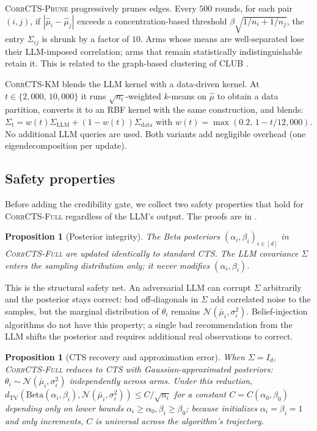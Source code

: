 \documentclass{article}
\theoremstyle{plain}
\newtheorem{proposition}[theorem]{Proposition}
\theoremstyle{definition}
\theoremstyle{remark}
\newcommand{\CorrFull}{\textsc{CorrCTS-Full}}
\newcommand{\EdgePrune}{\textsc{CorrCTS-Prune}}
\newcommand{\KMRefine}{\textsc{CorrCTS-KM}}
\begin{document}
\EdgePrune{} progressively prunes edges.
Every $500$ rounds, for each pair $(i,j)$, if $|\hat\mu_i - \hat\mu_j|$ exceeds a concentration-based threshold $\beta \sqrt{1/n_i + 1/n_j}$, the entry $\Sigma_{ij}$ is shrunk by a factor of $10$.
Arms whose means are well-separated lose their LLM-imposed correlation; arms that remain statistically indistinguishable retain it.
This is related to the graph-based clustering of CLUB \citep{gentile2014online}.

\KMRefine{} blends the LLM kernel with a data-driven kernel.
At $t \in \{2{,}000,\, 10{,}000\}$ it runs $\sqrt{n_i}$-weighted $k$-means on $\hat\mu$ to obtain a data partition, converts it to an RBF kernel with the same construction, and blends: $\Sigma_t = w(t) \Sigma_{\text{LLM}} + (1 - w(t)) \Sigma_{\text{data}}$ with $w(t) = \max(0.2,\, 1 - t/12{,}000)$.
No additional LLM queries are used.
Both variants add negligible overhead (one eigendecomposition per update).

\subsection{Safety properties}\label{sec:safety}

Before adding the credibility gate, we collect two safety properties that hold for \CorrFull{} regardless of the LLM's output.
The proofs are in .

\begin{proposition}[Posterior integrity]\label{prop:integrity}
The Beta posteriors $(\alpha_i, \beta_i)_{i \in [d]}$ in \CorrFull{} are updated identically to standard CTS.
The LLM covariance $\Sigma$ enters the sampling distribution only; it never modifies $(\alpha_i, \beta_i)$.
\end{proposition}

This is the structural safety net.
An adversarial LLM can corrupt $\Sigma$ arbitrarily and the posterior stays correct: bad off-diagonals in $\Sigma$ add correlated noise to the samples, but the marginal distribution of $\theta_i$ remains $\mathcal{N}(\bar\mu_i, \sigma_i^2)$.
Belief-injection algorithms do not have this property; a single bad recommendation from the LLM shifts the posterior and requires additional real observations to correct.

\begin{proposition}[CTS recovery and approximation error]\label{prop:recovery}
When $\Sigma = I_d$, \CorrFull{} reduces to CTS with Gaussian-approximated posteriors: $\theta_i \sim \mathcal{N}(\bar\mu_i, \sigma_i^2)$ independently across arms.
Under this reduction, $d_{\text{TV}}(\mathrm{Beta}(\alpha_i, \beta_i), \mathcal{N}(\bar\mu_i, \sigma_i^2)) \leq C/\sqrt{n_i}$ for a constant $C = C(\alpha_0, \beta_0)$ depending only on lower bounds $\alpha_i \geq \alpha_0, \beta_i \geq \beta_0$; because  initializes $\alpha_i = \beta_i = 1$ and only increments, $C$ is universal across the algorithm's trajectory.
\end{proposition}
\end{document}
